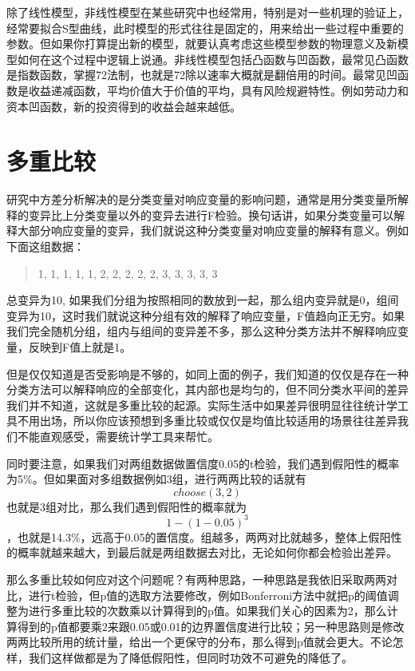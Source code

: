 \documentclass[]{tufte-book}
\begin{document}
除了线性模型，非线性模型在某些研究中也经常用，特别是对一些机理的验证上，经常要拟合S型曲线，此时模型的形式往往是固定的，用来给出一些过程中重要的参数。但如果你打算提出新的模型，就要认真考虑这些模型参数的物理意义及新模型如何在这个过程中逻辑上说通。非线性模型包括凸函数与凹函数，最常见凸函数是指数函数，掌握72法制，也就是72除以速率大概就是翻倍用的时间。最常见凹函数是收益递减函数，平均价值大于价值的平均，具有风险规避特性。例如劳动力和资本凹函数，新的投资得到的收益会越来越低。

\hypertarget{ux591aux91cdux6bd4ux8f83}{%
\section{多重比较}\label{ux591aux91cdux6bd4ux8f83}}

研究中方差分析解决的是分类变量对响应变量的影响问题，通常是用分类变量所解释的变异比上分类变量以外的变异去进行F检验。换句话讲，如果分类变量可以解释大部分响应变量的变异，我们就说这种分类变量对响应变量的解释有意义。例如下面这组数据：

\begin{quote}
1, 1, 1, 1, 1, 2, 2, 2, 2, 2, 3, 3, 3, 3, 3
\end{quote}

总变异为10, 如果我们分组为按照相同的数放到一起，那么组内变异就是0，组间变异为10，这时我们就说这种分组有效的解释了响应变量，F值趋向正无穷。如果我们完全随机分组，组内与组间的变异差不多，那么这种分类方法并不解释响应变量，反映到F值上就是1。

但是仅仅知道是否受影响是不够的，如同上面的例子，我们知道的仅仅是存在一种分类方法可以解释响应的全部变化，其内部也是均匀的，但不同分类水平间的差异我们并不知道，这就是多重比较的起源。实际生活中如果差异很明显往往统计学工具不用出场，所以你应该预想到多重比较或仅仅是均值比较适用的场景往往差异我们不能直观感受，需要统计学工具来帮忙。

同时要注意，如果我们对两组数据做置信度0.05的t检验，我们遇到假阳性的概率为5\%。但如果面对多组数据例如3组，进行两两比较的话就有\[choose(3,2)\]也就是3组对比，那么我们遇到假阳性的概率就为\[1-(1-0.05)^3\]，也就是14.3\%，远高于0.05的置信度。组越多，两两对比就越多，整体上假阳性的概率就越来越大，到最后就是两组数据去对比，无论如何你都会检验出差异。

那么多重比较如何应对这个问题呢？有两种思路，一种思路是我依旧采取两两对比，进行t检验，但p值的选取方法要修改，例如Bonferroni方法中就把p的阈值调整为进行多重比较的次数乘以计算得到的p值。如果我们关心的因素为2，那么计算得到的p值都要乘2来跟0.05或0.01的边界置信度进行比较；另一种思路则是修改两两比较所用的统计量，给出一个更保守的分布，那么得到p值就会更大。不论怎样，我们这样做都是为了降低假阳性，但同时功效不可避免的降低了。
\end{document}

